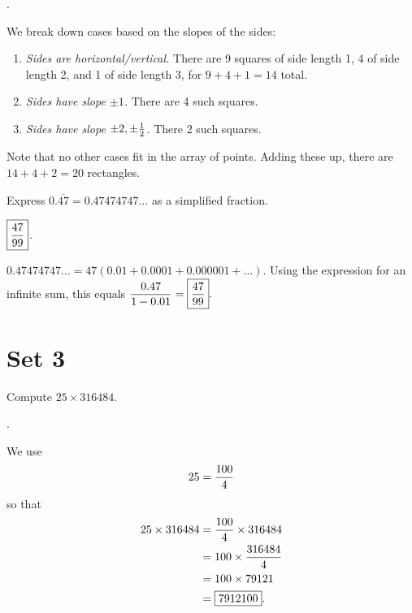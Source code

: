 \documentclass[11pt]{article}
\DeclareRobustCommand{\frac}[3][0pt]{%
  {\begingroup\hspace{#1}#2\hspace{#1}\endgroup\over\hspace{#1}#3\hspace{#1}}}
\begin{document}
\begin{answer} . \end{answer}
\begin{solution}
We break down cases based on the slopes of the sides:
\begin{enumerate}
\item \emph{Sides are horizontal/vertical.} There are 9 squares of side length 1, 4 of side length 2, and 1 of side length 3, for $9 + 4 + 1 = 14$ total.
\item \emph{Sides have slope $\pm 1$.} There are 4 such squares.
\item \emph{Sides have slope $\pm 2, \pm \frac{1}{2}$.} There 2 such squares.
\end{enumerate}
Note that no other cases fit in the array of points. Adding these up, there are $14 + 4 + 2 = \boxed{20}$ rectangles.
\end{solution}

\begin{problem}Express $0.\overline{47} = 0.47474747\ldots$ as a simplified fraction.
\end{problem}

\begin{answer} $\boxed{\displaystyle \frac{47}{99}}$. \end{answer}

\begin{solution}
$\displaystyle 0.47474747\ldots = 47(0.01 + 0.0001 + 0.000001 + \ldots)$. Using the expression for an infinite sum, this equals $\displaystyle \frac{0.47}{1 - 0.01} = \boxed{\frac{47}{99}}.$
\end{solution}

\eject

\section*{Set 3}

\begin{problem}Compute $25 \times 316484$.
\end{problem}
\begin{answer}
.
\end{answer}
\begin{solution}
We use
$$25 = \frac{100}{4}$$
so that
\begin{align*}
25 \times 316484 &= \frac{100}{4} \times 316484 \\
&= 100 \times \frac{316484}{4} \\
&= 100 \times 79121 \\
&= \boxed{7912100}.
\end{align*}
\end{solution}
\end{document}
